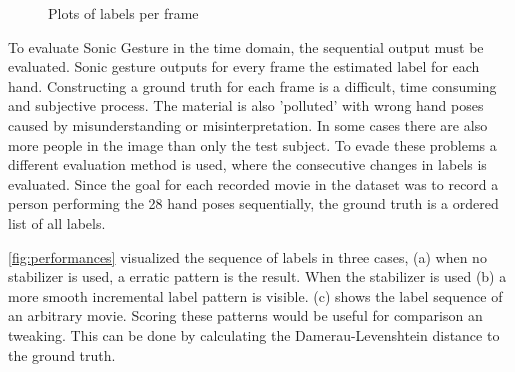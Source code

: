 \begin{figure}[htbp]
\center{}
\hspace{0.02\linewidth}
\hspace{0.02\linewidth}
\caption{Plots of labels per frame}
\label{fig:performances}
\end{figure}

To evaluate Sonic Gesture in the time domain, the sequential output must be evaluated. Sonic gesture outputs for every frame the estimated label for each hand. Constructing a ground truth for each frame is a difficult, time consuming and subjective process. The material is also 'polluted' with wrong hand poses caused by misunderstanding or misinterpretation. In some cases there are also more people in the image than only the test subject. To evade these problems a different evaluation method is used, where the consecutive changes in labels is evaluated. Since the goal for each recorded movie in the dataset was to record a person performing the 28 hand poses sequentially, the ground truth is a ordered list of all labels.

\autoref{fig:performances} visualized the sequence of labels in three cases, (a) when no stabilizer is used, a erratic pattern is the result. When the stabilizer is used (b) a more smooth incremental label pattern is visible. (c) shows the label sequence of an arbitrary movie. Scoring these patterns would be useful for comparison an tweaking. This can be done by calculating the Damerau-Levenshtein distance to the ground truth.

